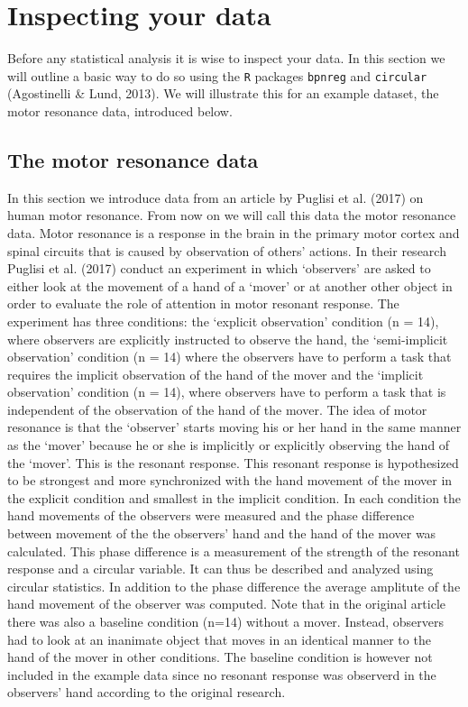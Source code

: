 \documentclass[11pt,]{article}
\begin{document}
\section{Inspecting your data}\label{DataInspection}

Before any statistical analysis it is wise to inspect your data. In this
section we will outline a basic way to do so using the \verb|R| packages
\verb|bpnreg| and \verb|circular| (Agostinelli \& Lund, 2013). We will
illustrate this for an example dataset, the motor resonance data,
introduced below.

\subsection{The motor resonance data}\label{regressionexample}

In this section we introduce data from an article by Puglisi et al.
(2017) on human motor resonance. From now on we will call this data the
motor resonance data. Motor resonance is a response in the brain in the
primary motor cortex and spinal circuits that is caused by observation
of others' actions. In their research Puglisi et al. (2017) conduct an
experiment in which `observers' are asked to either look at the movement
of a hand of a `mover' or at another other object in order to evaluate
the role of attention in motor resonant response. The experiment has
three conditions: the `explicit observation' condition (n = 14), where
observers are explicitly instructed to observe the hand, the
`semi-implicit observation' condition (n = 14) where the observers have
to perform a task that requires the implicit observation of the hand of
the mover and the `implicit observation' condition (n = 14), where
observers have to perform a task that is independent of the observation
of the hand of the mover. The idea of motor resonance is that the
`observer' starts moving his or her hand in the same manner as the
`mover' because he or she is implicitly or explicitly observing the hand
of the `mover'. This is the resonant response. This resonant response is
hypothesized to be strongest and more synchronized with the hand
movement of the mover in the explicit condition and smallest in the
implicit condition. In each condition the hand movements of the
observers were measured and the phase difference between movement of the
the observers' hand and the hand of the mover was calculated. This phase
difference is a measurement of the strength of the resonant response and
a circular variable. It can thus be described and analyzed using
circular statistics. In addition to the phase difference the average
amplitute of the hand movement of the observer was computed. Note that
in the original article there was also a baseline condition (n=14)
without a mover. Instead, observers had to look at an inanimate object
that moves in an identical manner to the hand of the mover in other
conditions. The baseline condition is however not included in the
example data since no resonant response was observerd in the observers'
hand according to the original research.
\end{document}
